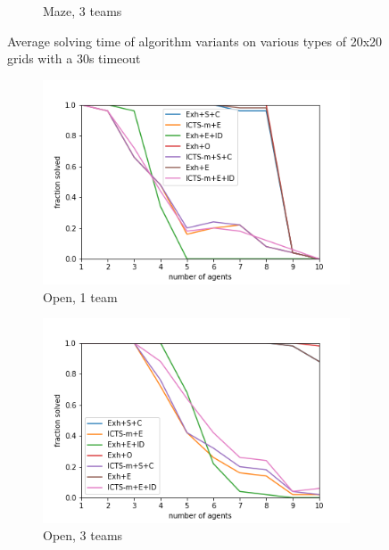 \documentclass[english]{article}
\begin{document}
\begin{figure}
\begin{subfigure}{0.49\textwidth}
			\caption{Maze, 3 teams}
			\label{fig:m3}
		\end{subfigure}
		\caption{Average solving time of algorithm variants on various types of 20x20 grids with a 30s timeout}
		\label{fig:times}
	\end{figure}
	
	\begin{figure}
		\centering
		\begin{subfigure}{0.49\textwidth}
			\centering
			\includegraphics[width=\linewidth]{img/results/open-1-p}
			\caption{Open, 1 team}
			\label{fig:open1p}
		\end{subfigure}
		\begin{subfigure}{0.49\textwidth}
			\centering
			\includegraphics[width=\linewidth]{img/results/open-3-p}
			\caption{Open, 3 teams}
			\label{fig:open3p}
		\end{subfigure}
		\begin{subfigure}{0.49\textwidth}

\end{subfigure}
\end{figure}
\end{document}
